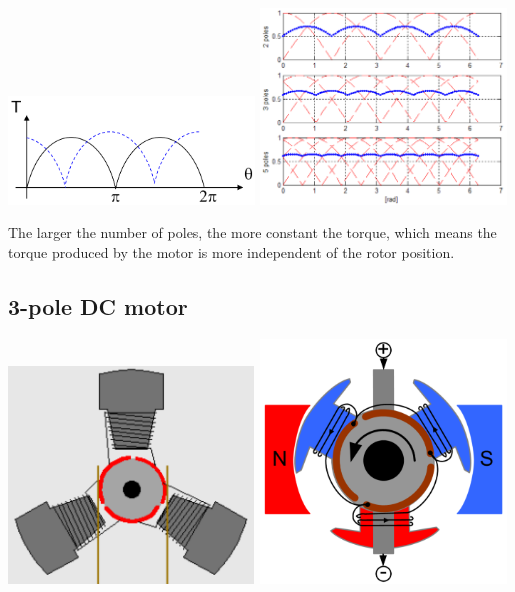 \documentclass[11pt]{article}
\begin{document}
\begin{center}
\includegraphics[width=0.49\textwidth]{./images/dc-motor-generated-torque-graph.png}
\includegraphics[width=0.49\textwidth]{./images/dc-motor-torque-graph-with-increasing-number-of-poles.png}
\end{center}

The larger the number of poles, the more constant the torque, which means the torque produced by the motor is more independent of the rotor position.
\subsection{3-pole DC motor}
\label{sec:org88cc6d0}
\begin{center}
\includegraphics[width=0.49\textwidth]{./images/3-pole-dc-motor-diagram.png}
\includegraphics[width=0.49\textwidth]{./images/3-pole-dc-motor-magnetic-poles.png}
\end{center}
\end{document}
